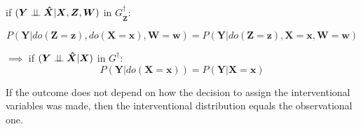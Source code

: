 \documentclass[11pt,a4paper,oneside]{book}
\begin{document}
if $(\boldsymbol{Y} \perp\!\!\!\perp \boldsymbol{\hat{X}}|\boldsymbol{X},\boldsymbol{Z},\boldsymbol{W})$ in $G^{\dagger}_{\boldsymbol{\overline{Z}}}$:

\begin{equation}
\label{eq:Do2}
P(\boldsymbol{Y}|do(\boldsymbol{Z}=\boldsymbol{z}),do(\boldsymbol{X}=\boldsymbol{x}),\boldsymbol{W}=\boldsymbol{w}) = P(\boldsymbol{Y}|do(\boldsymbol{Z}=\boldsymbol{z}),\boldsymbol{X}=\boldsymbol{x},\boldsymbol{W}=\boldsymbol{w})
\end{equation}

$\implies$ if  $(\boldsymbol{Y} \perp\!\!\!\perp \boldsymbol{\hat{X}}|\boldsymbol{X})$ in $G^{\dagger}$:
\begin{equation}
\label{eq:Do22}
P(\boldsymbol{Y}|do(\boldsymbol{X}=\boldsymbol{x})) = P(\boldsymbol{Y}|\boldsymbol{X}=\boldsymbol{x})
\end{equation}

If the outcome does not depend on how the decision to assign the interventional variables was made, then the interventional distribution equals the observational one. 
\end{document}

